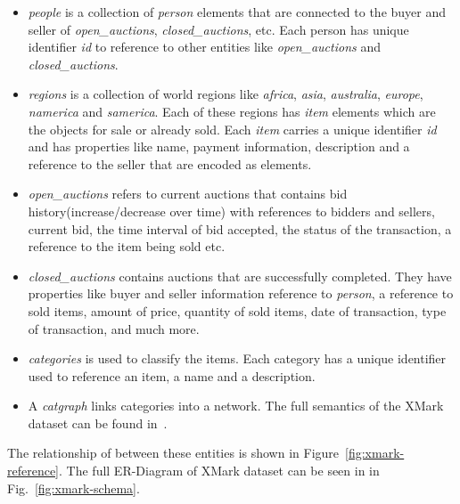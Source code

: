 \begin{itemize}	
	\item
	\textit{people} is a collection of \textit{person} elements that are connected to the buyer and seller of \textit{open\_auctions}, \textit{closed\_auctions}, etc. Each person has unique identifier \textit{id} to reference to other entities like \textit{open\_auctions} and \textit{closed\_auctions}.
	\item
	\textit{regions} is a collection of world regions like \textit{africa}, \textit{asia}, \textit{australia}, \textit{europe}, \textit{namerica} and \textit{samerica}. Each of these regions has \textit{item} elements which are the objects for sale or already sold. Each \textit{item} carries a unique identifier \textit{id} and has properties like name, payment information, description and a reference to the seller that are encoded as elements. 
	\item
		\textit{open\_auctions} refers to current auctions that contains bid history(increase/decrease over time) with references to bidders and sellers, current bid, the time interval of bid accepted, the status of the transaction, a reference to the item being sold etc.
	\item
		\textit{closed\_auctions} contains auctions that are successfully completed. They have properties like buyer and seller information reference to \textit{person}, a reference to sold items, amount of price, quantity of sold items, date of transaction, type of transaction, and much more.
	\item 
		\textit{categories} is used to classify the items. Each category has a unique identifier used to reference an item, a name and a description.
	\item
		  A \textit{catgraph} links categories into a network.  The full semantics of the XMark dataset can be found in~\cite{xmark/original}.
\end{itemize}
The relationship of between these entities is shown in Figure~\ref{fig:xmark-reference}.  The full ER-Diagram of XMark dataset can be seen in in Fig.~\ref{fig:xmark-schema}. 
